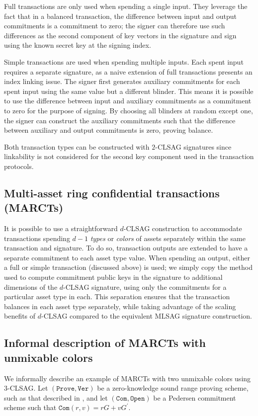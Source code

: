 \documentclass{mrl}
\theoremstyle{plain}
\theoremstyle{definition}
\begin{document}
Full transactions are only used when spending a single input. They leverage the fact that in a balanced transaction, the difference between input and output commitments is a commitment to zero; the signer can therefore use such differences as the second component of key vectors in the signature and sign using the known secret key at the signing index.

Simple transactions are used when spending multiple inputs. Each spent input requires a separate signature, as a naive extension of full transactions presents an index linking issue. The signer first generates auxiliary commitments for each spent input using the same value but a different blinder. This means it is possible to use the difference between input and auxiliary commitments as a commitment to zero for the purpose of signing. By choosing all blinders at random except one, the signer can construct the auxiliary commitments such that the difference between auxiliary and output commitments is zero, proving balance.

Both transaction types can be constructed with $2$-CLSAG signatures since linkability is not considered for the second key component used in the transaction protocols.


\subsection{Multi-asset ring confidential transactions (MARCTs)}\label{sec:marct}
It is possible to use a straightforward $d$-CLSAG construction to accommodate transactions spending $d-1$ \textit{types} or \textit{colors} of assets separately within the same transaction and signature. To do so, transaction outputs are extended to have a separate commitment to each asset type value. When spending an output, either a full or simple transaction (discussed above) is used; we simply copy the method used to compute commitment public keys in the signature to additional dimensions of the $d$-CLSAG signature, using only the commitments for a particular asset type in each. This separation ensures that the transaction balances in each asset type separately, while taking advantage of the scaling benefits of $d$-CLSAG compared to the equivalent MLSAG signature construction.


\subsection{Informal description of MARCTs with unmixable colors}
We informally describe an example of MARCTs with two unmixable colors using $3$-CLSAG. Let $(\texttt{Prove}, \texttt{Ver})$ be a zero-knowledge sound range proving scheme, such as that described in \cite{bulletproofs}, and let $(\texttt{Com}, \texttt{Open})$ be a Pedersen commitment scheme such that $\texttt{Com}(r,v) = rG + v G^\prime$.
\end{document}
